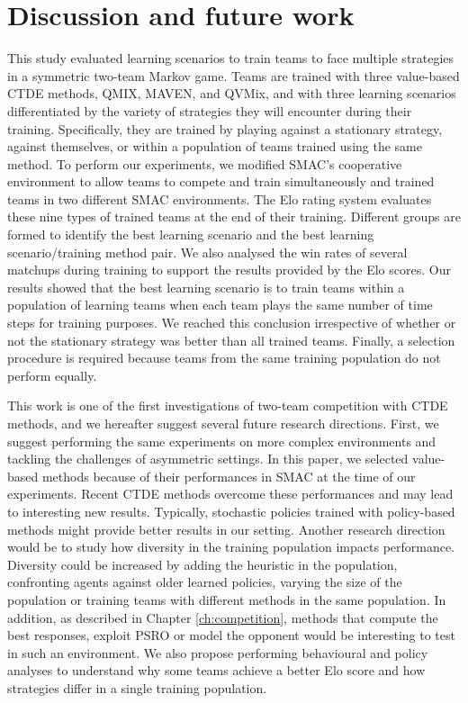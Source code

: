 \section{Discussion and future work} \label{sec:ch7_conclu}
This study evaluated learning scenarios to train teams to face multiple strategies in a symmetric two-team Markov game.
Teams are trained with three value-based CTDE methods, QMIX, MAVEN, and QVMix, and with three learning scenarios differentiated by the variety of strategies they will encounter during their training.
Specifically, they are trained by playing against a stationary strategy, against themselves, or within a population of teams trained using the same method.
To perform our experiments, we modified SMAC's cooperative environment to allow teams to compete and train simultaneously and trained teams in two different SMAC environments.
The Elo rating system evaluates these nine types of trained teams at the end of their training.
Different groups are formed to identify the best learning scenario and the best learning scenario/training method pair.
We also analysed the win rates of several matchups during training to support the results provided by the Elo scores.
Our results showed that the best learning scenario is to train teams within a population of learning teams when each team plays the same number of time steps for training purposes.
We reached this conclusion irrespective of whether or not the stationary strategy was better than all trained teams.
Finally, a selection procedure is required because teams from the same training population do not perform equally.

This work is one of the first investigations of two-team competition with CTDE methods, and we hereafter suggest several future research directions.
First, we suggest performing the same experiments on more complex environments and tackling the challenges of asymmetric settings.
In this paper, we selected value-based methods because of their performances in SMAC \citep{samvelyan2019starcraft} at the time of our experiments.
Recent CTDE methods overcome these performances and may lead to interesting new results.
Typically, stochastic policies trained with policy-based methods might provide better results in our setting.
Another research direction would be to study how diversity in the training population impacts performance. 
Diversity could be increased by adding the heuristic in the population, confronting agents against older learned policies, varying the size of the population or training teams with different methods in the same population.
In addition, as described in Chapter \ref{ch:competition}, methods that compute the best responses, exploit PSRO or model the opponent would be interesting to test in such an environment.
We also propose performing behavioural and policy analyses to understand why some teams achieve a better Elo score and how strategies differ in a single training population.